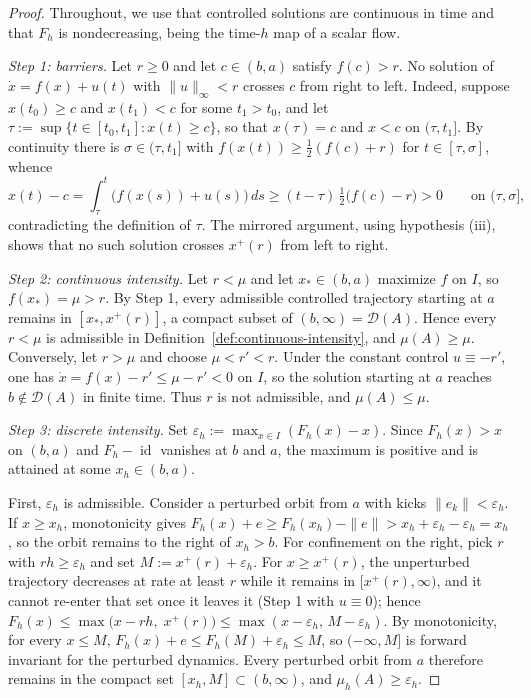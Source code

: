 \documentclass[pdflatex,sn-mathphys-num]{sn-jnl}
\numberwithin{equation}{section}
\theoremstyle{thmstyleone}%
\theoremstyle{definition}
\theoremstyle{remark}
\begin{document}
\begin{proof}
Throughout, we use that controlled solutions are continuous in time and
that $F_h$ is nondecreasing, being the time-$h$ map of a scalar flow.

\emph{Step 1: barriers.}
Let $r\geq0$ and let $c\in(b,a)$ satisfy $f(c)>r$. No solution of
$\dot x=f(x)+u(t)$ with $\|u\|_\infty<r$ crosses $c$ from right to
left. Indeed, suppose $x(t_0)\geq c$ and $x(t_1)<c$ for some
$t_1>t_0$, and let
$\tau:=\sup\{t\in[t_0,t_1]:x(t)\geq c\}$, so that $x(\tau)=c$ and
$x<c$ on $(\tau,t_1]$. By continuity there is $\sigma\in(\tau,t_1]$
with $f(x(t))\geq\tfrac12(f(c)+r)$ for $t\in[\tau,\sigma]$, whence
\[
    x(t)-c
    =
    \int_\tau^t\bigl(f(x(s))+u(s)\bigr)\,ds
    \geq
    (t-\tau)\,\tfrac12\bigl(f(c)-r\bigr)
    >0
    \qquad\text{on }(\tau,\sigma],
\]
contradicting the definition of $\tau$. The mirrored argument, using
hypothesis (iii), shows that no such solution crosses $x^+(r)$ from
left to right.

\emph{Step 2: continuous intensity.}
Let $r<\mu$ and let $x_*\in(b,a)$ maximize $f$ on $I$, so
$f(x_*)=\mu>r$. By Step 1, every admissible controlled trajectory
starting at $a$ remains in $[x_*,x^+(r)]$, a compact subset of
$(b,\infty)=\mathcal D(A)$. Hence every $r<\mu$ is admissible in
Definition~\ref{def:continuous-intensity}, and $\mu(A)\geq\mu$.
Conversely, let $r>\mu$ and choose $\mu<r'<r$. Under the constant
control $u\equiv-r'$, one has $\dot x=f(x)-r'\leq\mu-r'<0$ on $I$, so
the solution starting at $a$ reaches $b\notin\mathcal D(A)$ in finite
time. Thus $r$ is not admissible, and $\mu(A)\leq\mu$.

\emph{Step 3: discrete intensity.}
Set $\varepsilon_h:=\max_{x\in I}(F_h(x)-x)$. Since $F_h(x)>x$ on
$(b,a)$ and $F_h-\operatorname{id}$ vanishes at $b$ and $a$, the
maximum is positive and is attained at some $x_h\in(b,a)$.

First, $\varepsilon_h$ is admissible. Consider a perturbed orbit from
$a$ with kicks $\|e_k\|<\varepsilon_h$. If $x\geq x_h$, monotonicity
gives
    $F_h(x)+e
    \geq
    F_h(x_h)-\|e\|
    >
    x_h+\varepsilon_h-\varepsilon_h
    =
    x_h$,
so the orbit remains to the right of $x_h>b$. For confinement on the
right, pick $r$ with $rh\geq\varepsilon_h$ and set
$M:=x^+(r)+\varepsilon_h$. For $x\geq x^+(r)$, the unperturbed
trajectory decreases at rate at least $r$ while it remains in
$[x^+(r),\infty)$, and it cannot re-enter that set once it leaves it
(Step 1 with $u\equiv0$); hence
$F_h(x)\leq\max\bigl(x-rh,\;x^+(r)\bigr)\leq\max(x-\varepsilon_h,\,
M-\varepsilon_h)$. By monotonicity, for every $x\leq M$,
    $F_h(x)+e
    \leq
    F_h(M)+\varepsilon_h
    \leq
    M$,
so $(-\infty,M]$ is forward invariant for the perturbed dynamics.
Every perturbed orbit from $a$ therefore remains in the compact set
$[x_h,M]\subset(b,\infty)$, and $\mu_h(A)\geq\varepsilon_h$.


\end{proof}
\end{document}
